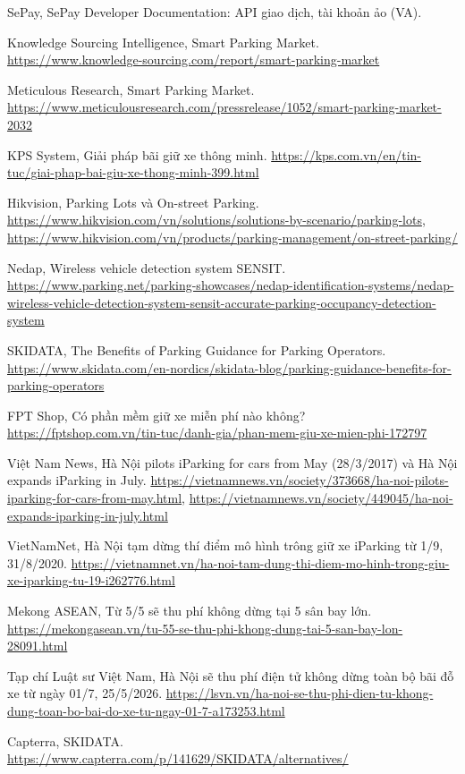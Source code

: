 \documentclass[12pt,letterpaper]{report}
\begin{document}
\begin{enumerate}[label={[\arabic*]}]
\item SePay, SePay Developer Documentation: API giao dịch, tài khoản ảo (VA).
\item Knowledge Sourcing Intelligence, Smart Parking Market.
  \url{https://www.knowledge-sourcing.com/report/smart-parking-market}
\item Meticulous Research, Smart Parking Market.
  \url{https://www.meticulousresearch.com/pressrelease/1052/smart-parking-market-2032}
\item KPS System, Giải pháp bãi giữ xe thông minh.
  \url{https://kps.com.vn/en/tin-tuc/giai-phap-bai-giu-xe-thong-minh-399.html}
\item Hikvision, Parking Lots và On-street Parking.
  \url{https://www.hikvision.com/vn/solutions/solutions-by-scenario/parking-lots},
  \url{https://www.hikvision.com/vn/products/parking-management/on-street-parking/}
\item Nedap, Wireless vehicle detection system SENSIT.
  \url{https://www.parking.net/parking-showcases/nedap-identification-systems/nedap-wireless-vehicle-detection-system-sensit-accurate-parking-occupancy-detection-system}
\item SKIDATA, The Benefits of Parking Guidance for Parking Operators.
  \url{https://www.skidata.com/en-nordics/skidata-blog/parking-guidance-benefits-for-parking-operators}
\item FPT Shop, Có phần mềm giữ xe miễn phí nào không?
  \url{https://fptshop.com.vn/tin-tuc/danh-gia/phan-mem-giu-xe-mien-phi-172797}
\item Việt Nam News, Hà Nội pilots iParking for cars from May (28/3/2017) và Hà Nội expands iParking in July.
  \url{https://vietnamnews.vn/society/373668/ha-noi-pilots-iparking-for-cars-from-may.html},
  \url{https://vietnamnews.vn/society/449045/ha-noi-expands-iparking-in-july.html}
\item VietNamNet, Hà Nội tạm dừng thí điểm mô hình trông giữ xe iParking từ 1/9, 31/8/2020.
  \url{https://vietnamnet.vn/ha-noi-tam-dung-thi-diem-mo-hinh-trong-giu-xe-iparking-tu-19-i262776.html}
\item Mekong ASEAN, Từ 5/5 sẽ thu phí không dừng tại 5 sân bay lớn.
  \url{https://mekongasean.vn/tu-55-se-thu-phi-khong-dung-tai-5-san-bay-lon-28091.html}
\item Tạp chí Luật sư Việt Nam, Hà Nội sẽ thu phí điện tử không dừng toàn bộ bãi đỗ xe từ ngày 01/7, 25/5/2026.
  \url{https://lsvn.vn/ha-noi-se-thu-phi-dien-tu-khong-dung-toan-bo-bai-do-xe-tu-ngay-01-7-a173253.html}
\item Capterra, SKIDATA. \url{https://www.capterra.com/p/141629/SKIDATA/alternatives/}

\end{enumerate}
\end{document}
